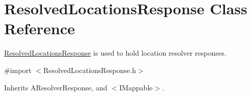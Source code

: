 \hypertarget{interface_resolved_locations_response}{}\section{Resolved\+Locations\+Response Class Reference}
\label{interface_resolved_locations_response}


\hyperlink{interface_resolved_locations_response}{Resolved\+Locations\+Response} is used to hold location resolver responses.  




{\ttfamily \#import $<$Resolved\+Locations\+Response.\+h$>$}



Inherits A\+Resolver\+Response, and $<$\+I\+Mappable$>$.

